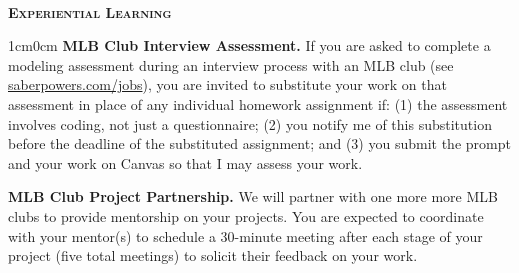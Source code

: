 \documentclass[11pt]{article}
\begin{document}
~\\
{\textbf{\textsc{Experiential Learning}}}
\begin{adjustwidth}{1cm}{0cm}
  \textbf{MLB Club Interview Assessment.} If you are asked to complete a modeling assessment during an interview process with an MLB club (see \href{https://saberpowers.com/jobs}{saberpowers.com/jobs}), you are invited to substitute your work on that assessment in place of any individual homework assignment if: (1) the assessment involves coding, not just a questionnaire; (2) you notify me of this substitution before the deadline of the substituted assignment; and (3) you submit the prompt and your work on Canvas so that I may assess your work.

  \textbf{MLB Club Project Partnership.} We will partner with one more more MLB clubs to provide mentorship on your projects. You are expected to coordinate with your mentor(s) to schedule a 30-minute meeting after each stage of your project (five total meetings) to solicit their feedback on your work.
\end{adjustwidth}


\newpage

\end{document}
